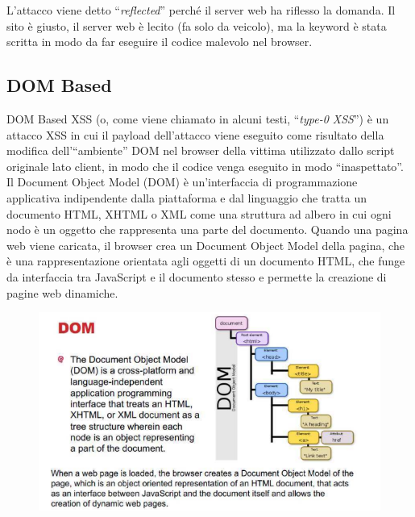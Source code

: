 L'attacco viene detto ``\textit{reflected}'' perché il server web ha riflesso la domanda. Il sito è giusto,
il server web è lecito (fa solo da veicolo), ma la keyword è stata scritta in modo da far eseguire il codice malevolo nel browser.

\subsection{DOM Based}

DOM Based XSS (o, come viene chiamato in alcuni testi, ``\textit{type-0 XSS}'') è un attacco XSS in
cui il payload dell'attacco viene eseguito come risultato della modifica dell'``ambiente'' DOM
nel browser della vittima utilizzato dallo script originale lato client, in modo che il codice
venga eseguito in modo ``inaspettato''.
Il Document Object Model (DOM) è un'interfaccia di programmazione applicativa indipendente dalla piattaforma e dal linguaggio che tratta un documento HTML, XHTML o XML come una struttura ad albero in cui ogni nodo è un oggetto che rappresenta una parte del documento.
Quando una pagina web viene caricata, il browser crea un Document Object Model della pagina, che è una rappresentazione orientata agli oggetti di un documento
HTML, che funge da interfaccia tra JavaScript e il documento stesso e permette la creazione di pagine web dinamiche.

\vspace{-1em}

\begin{figure}[H]
      \centering
      \includegraphics[width=\textwidth, keepaspectratio]{capitoli/secure_coding/img/cap_9/dom.png}
\end{figure}

\vspace{-2em}

